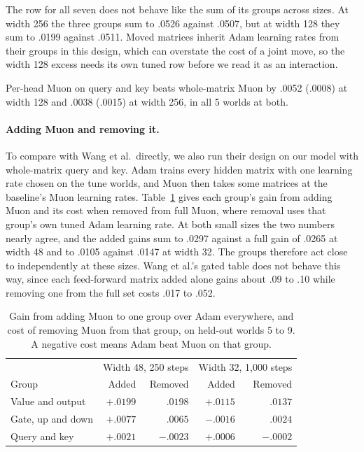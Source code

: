 \documentclass[11pt]{article}
\begin{document}
The row for all seven does not behave like the sum of its groups across sizes. At width 256 the three groups sum to .0526 against .0507, but at width 128 they sum to .0199 against .0511. Moved matrices inherit Adam learning rates from their groups in this design, which can overstate the cost of a joint move, so the width 128 excess needs its own tuned row before we read it as an interaction.

Per-head Muon on query and key beats whole-matrix Muon by .0052 (.0008) at width 128 and .0038 (.0015) at width 256, in all 5 worlds at both.

\paragraph{Adding Muon and removing it.} To compare with Wang et al.\ directly, we also run their design on our model with whole-matrix query and key. Adam trains every hidden matrix with one learning rate chosen on the tune worlds, and Muon then takes some matrices at the baseline's Muon learning rates. Table~\ref{tab:add} gives each group's gain from adding Muon and its cost when removed from full Muon, where removal uses that group's own tuned Adam learning rate. At both small sizes the two numbers nearly agree, and the added gains sum to .0297 against a full gain of .0265 at width 48 and to .0105 against .0147 at width 32. The groups therefore act close to independently at these sizes. Wang et al.'s gated table does not behave this way, since each feed-forward matrix added alone gains about .09 to .10 while removing one from the full set costs .017 to .052.

\begin{table}[t]
\centering
\begin{tabular}{lrrrr}
\toprule
& \multicolumn{2}{c}{Width 48, 250 steps} & \multicolumn{2}{c}{Width 32, 1,000 steps} \\
Group & Added & Removed & Added & Removed \\
\midrule
Value and output & $+.0199$ & $.0198$ & $+.0115$ & $.0137$ \\
Gate, up and down & $+.0077$ & $.0065$ & $-.0016$ & $.0024$ \\
Query and key & $+.0021$ & $-.0023$ & $+.0006$ & $-.0002$ \\
\bottomrule
\end{tabular}
\caption{Gain from adding Muon to one group over Adam everywhere, and cost of removing Muon from that group, on held-out worlds 5 to 9. A negative cost means Adam beat Muon on that group.}
\label{tab:add}
\end{table}
\end{document}
